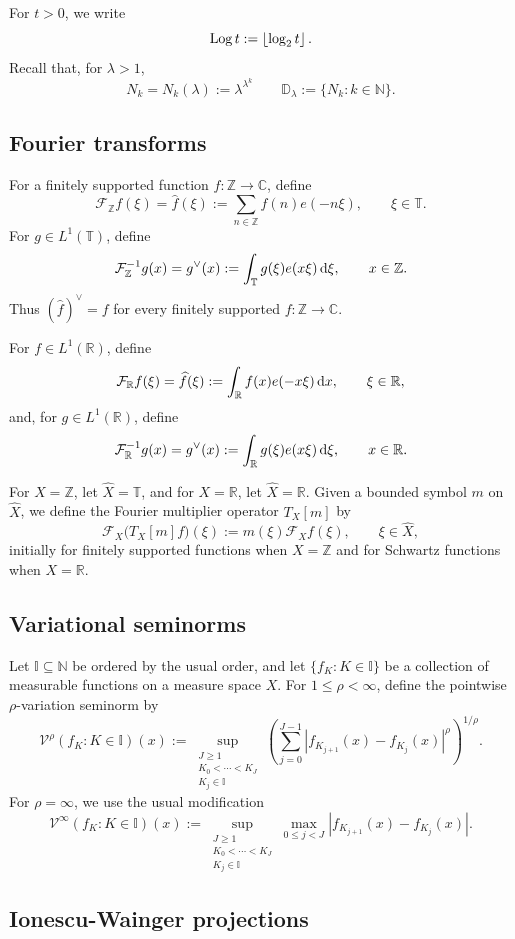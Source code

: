 \documentclass[12pt,leqno]{amsart}
\def\d{{\rm d}}
\def\R {\mathbb{R}}
\def\N {\mathbb{N}}
\def\Z {{\mathbb Z}}
\def\CC{\mathbb{C}}
\newcommand{\TT}{\mathbb{ T} }
\newcommand{\F}{\mathcal{F}}
\numberwithin{equation}{section}
\numberwithin{counter2}{section}
\theoremstyle{definition}
\theoremstyle{plain}
\newcommand{\floor}[1]{\left\lfloor #1 \right\rfloor}
\begin{document}
For $t>0$, we write
\[
{\rm Log\,}t:=\floor{\log_2 t}.
\]
Recall that, for $\lambda>1$,
\[
N_k=N_k(\lambda):=\lambda^{\lambda^k}
\qquad
\mathbb D_\lambda:=\{N_k:k\in\N\}.
\]

\subsection{Fourier transforms}

For a finitely supported function $f\colon\Z\to\CC$, define
\[
\F_{\Z}f(\xi)=\widehat f(\xi)
:=\sum_{n\in\Z}f(n)e(-n\xi),
\qquad \xi\in\TT.
\]
For $g\in L^1(\TT)$, define
\[
\F_{\Z}^{-1}g(x)=g^{\vee}(x)
:=\int_{\TT}g(\xi)e(x\xi)\,\d\xi,
\qquad x\in\Z.
\]
Thus $(\widehat f)^{\vee}=f$ for every finitely supported $f\colon\Z\to\CC$.

For $f\in L^1(\R)$, define
\[
\F_{\R}f(\xi)=\widehat f(\xi)
:=\int_{\R}f(x)e(-x\xi)\,\d x,
\qquad \xi\in\R,
\]
and, for $g\in L^1(\R)$, define
\[
\F_{\R}^{-1}g(x)=g^{\vee}(x)
:=\int_{\R}g(\xi)e(x\xi)\,\d\xi,
\qquad x\in\R.
\]


For $X=\Z$, let $\widehat X=\TT$, and for $X=\R$, let $\widehat X=\R$. Given a bounded symbol $m$ on $\widehat X$, we define the Fourier multiplier operator $T_X[m]$ by
\[
\F_X\bigl(T_X[m]f\bigr)(\xi)
:=m(\xi)\F_Xf(\xi),
\qquad \xi\in\widehat X,
\]
initially for finitely supported functions when $X=\Z$ and for Schwartz functions when $X=\R$.

\subsection{Variational seminorms}

Let $\mathbb I\subseteq\N$ be ordered by the usual order, and let $\{f_K:K\in\mathbb I\}$ be a collection of measurable functions on a measure space $X$. For $1\leq\rho<\infty$, define the pointwise $\rho$-variation seminorm by
\[
\mathcal V^{\rho}(f_K:K\in\mathbb I)(x)
:=\sup_{\substack{J\geq1\\K_0<\cdots<K_J\\K_j\in\mathbb I}}
\left(
\sum_{j=0}^{J-1}
\left|f_{K_{j+1}}(x)-f_{K_j}(x)\right|^{\rho}
\right)^{1/\rho}.
\]
For $\rho=\infty$, we use the usual modification
\[
\mathcal V^{\infty}(f_K:K\in\mathbb I)(x)
:=\sup_{\substack{J\geq1\\K_0<\cdots<K_J\\K_j\in\mathbb I}}
\max_{0\leq j<J}
\left|f_{K_{j+1}}(x)-f_{K_j}(x)\right|.
\]

\subsection{Ionescu-Wainger projections}
\end{document}
